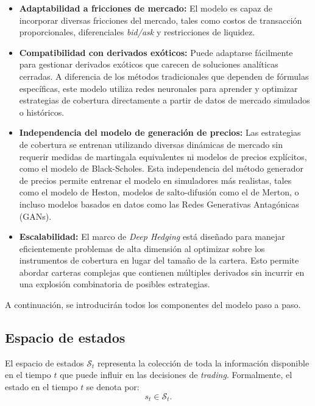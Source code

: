 \documentclass[11pt,a4paper,spanish]{article}
\numberwithin{equation}{section} %
\begin{document}
\begin{itemize} 
\item \textbf{Adaptabilidad a fricciones de mercado:} El modelo es capaz de incorporar diversas fricciones del mercado, tales como costos de transacción proporcionales, diferenciales \textit{bid/ask} y restricciones de liquidez. 

\item \textbf{Compatibilidad con derivados exóticos:} Puede adaptarse fácilmente para gestionar derivados exóticos que carecen de soluciones analíticas cerradas. A diferencia de los métodos tradicionales que dependen de fórmulas específicas, este modelo utiliza redes neuronales para aprender y optimizar estrategias de cobertura directamente a partir de datos de mercado simulados o históricos. 

\item \textbf{Independencia del modelo de generación de precios:} Las estrategias de cobertura se entrenan utilizando diversas dinámicas de mercado sin requerir medidas de martingala equivalentes ni modelos de precios explícitos, como el modelo de Black-Scholes. Esta independencia del método generador de precios permite entrenar el modelo en simuladores más realistas, tales como el modelo de Heston, modelos de salto-difusión como el de Merton, o incluso modelos basados en datos como las Redes Generativas Antagónicas (GANs).

\item \textbf{Escalabilidad:} El marco de \textit{Deep Hedging} está diseñado para manejar eficientemente problemas de alta dimensión al optimizar sobre los instrumentos de cobertura en lugar del tamaño de la cartera. Esto permite abordar carteras complejas que contienen múltiples derivados sin incurrir en una explosión combinatoria de posibles estrategias.

\end{itemize}



A continuación, se introducirán todos los componentes del modelo paso a paso.

\subsection{Espacio de estados}

El espacio de estados \( \mathcal{S}_t \) representa la colección de toda la información disponible en el tiempo \( t \) que puede influir en las decisiones de \textit{trading}. Formalmente, el estado en el tiempo \( t \) se denota por:
\begin{equation}
s_t \in \mathcal{S}_t.
\end{equation}
\end{document}
